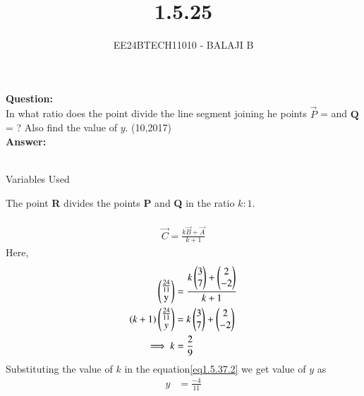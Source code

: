 \documentclass[journal]{IEEEtran}
\begin{document}

\vspace{3cm}

\title{1.5.25}
\author{EE24BTECH11010 - BALAJI B}
{\let\newpage\relax\maketitle}

\renewcommand{\thefigure}{\theenumi}
\renewcommand{\thetable}{\theenumi}
\setlength{\intextsep}{10pt} %


\renewcommand{\thetable}{\theenumi}

\textbf{Question:}
\\
In what ratio does the point  divide the line segment joining he points $\vec{P}$ =  and $\textbf{Q}$ =  ? Also find the value of $y$. \hfill(10,2017)\\ 


\textbf{Answer:} \\ \\
\begin{table}[h!]    
  \centering
  
  \caption{Variables Used}
  \label{tab1.5.37.1}
\end{table}

The point \textbf{R}  divides the points \textbf{P} and \textbf{Q}
in the ratio $k:1$. \\ \\

\begin{align}
    \vec{C}=\frac{k\vec{B}+\vec{A}}{k+1}\label{eq1.5.37.1}
\end{align}
Here,
\begin{align}
    \myvec{\frac{24}{11}\\$y$} &= \frac{k \myvec{3\\7}+\myvec{2\\-2}}{k+1}\label{eq1.5.37.2}\\ 
    (k+1)\myvec{\frac{24}{11}\\y} &= k\myvec{3\\7}+ \myvec{2\\-2}\\
    \implies k &= \frac{2}{9}
\end{align}
Substituting the value of $k$ in the equation\eqref{eq1.5.37.2} we get value of $y$ as
\begin{align}
    y &= \frac{-4}{11}
\end{align}
\end{document}
